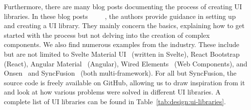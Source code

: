 Furthermore, there are many blog posts documenting the process of creating UI libraries. In these blog posts~~~~~, the authors provide guidance in setting up and creating a UI library. They mainly concern the basics, explaining how to get started with the process but not delving into the creation of complex components.
We also find numerous examples from the industry. These include but are not limited to Svelte Material UI~ (written in Svelte), React Bootstrap~ (React), Angular Material~ (Angular), Wired Elements~ (Web Components), and Onsen~ and SyncFusion~ (both multi-framework). For all but SyncFusion, the source code is freely available on GitHub, allowing us to draw inspiration from it and look at how various problems were solved in different UI libraries. A complete list of UI libraries can be found in Table~\ref{tab:design:ui-libraries}.

